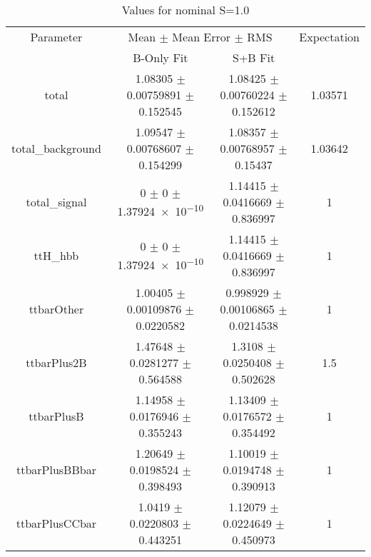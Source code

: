 \begin{table}
\centering
\caption{Values for nominal S=1.0}
\begin{tabular}{cccc}
\toprule
Parameter & \multicolumn{2}{c}{Mean $\pm$ Mean Error $\pm$ RMS} & Expectation\\
 & B-Only Fit & S+B Fit & \\
\midrule
total & \num{1.08305} $\pm$ \num{0.00759891} $\pm$ \num{0.152545} & \num{1.08425} $\pm$ \num{0.00760224} $\pm$ \num{0.152612} & \num{1.03571}\\
total\_background & \num{1.09547} $\pm$ \num{0.00768607} $\pm$ \num{0.154299} & \num{1.08357} $\pm$ \num{0.00768957} $\pm$ \num{0.15437} & \num{1.03642}\\
total\_signal & \num{0} $\pm$ \num{0} $\pm$ \num{1.37924e-10} & \num{1.14415} $\pm$ \num{0.0416669} $\pm$ \num{0.836997} & \num{1}\\
ttH\_hbb & \num{0} $\pm$ \num{0} $\pm$ \num{1.37924e-10} & \num{1.14415} $\pm$ \num{0.0416669} $\pm$ \num{0.836997} & \num{1}\\
ttbarOther & \num{1.00405} $\pm$ \num{0.00109876} $\pm$ \num{0.0220582} & \num{0.998929} $\pm$ \num{0.00106865} $\pm$ \num{0.0214538} & \num{1}\\
ttbarPlus2B & \num{1.47648} $\pm$ \num{0.0281277} $\pm$ \num{0.564588} & \num{1.3108} $\pm$ \num{0.0250408} $\pm$ \num{0.502628} & \num{1.5}\\
ttbarPlusB & \num{1.14958} $\pm$ \num{0.0176946} $\pm$ \num{0.355243} & \num{1.13409} $\pm$ \num{0.0176572} $\pm$ \num{0.354492} & \num{1}\\
ttbarPlusBBbar & \num{1.20649} $\pm$ \num{0.0198524} $\pm$ \num{0.398493} & \num{1.10019} $\pm$ \num{0.0194748} $\pm$ \num{0.390913} & \num{1}\\
ttbarPlusCCbar & \num{1.0419} $\pm$ \num{0.0220803} $\pm$ \num{0.443251} & \num{1.12079} $\pm$ \num{0.0224649} $\pm$ \num{0.450973} & \num{1}\\
\bottomrule
\end{tabular}
\end{table}